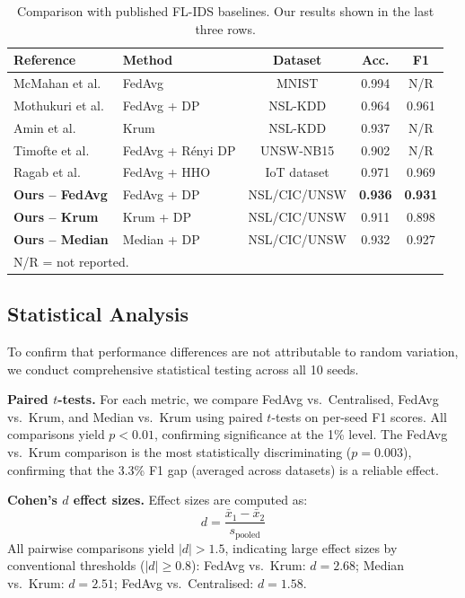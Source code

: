 \documentclass[conference]{IEEEtran}
\begin{document}
\begin{table}[htbp]
\centering
\caption{Comparison with published FL-IDS baselines. Our results
shown in the last three rows.}
\label{tab:published_baselines}
\setlength{\tabcolsep}{4pt}
\begin{tabular}{llccc}
\toprule
\textbf{Reference} & \textbf{Method} & \textbf{Dataset} &
  \textbf{Acc.} & \textbf{F1} \\
\midrule
McMahan et al.~\cite{mcmahan2017} & FedAvg & MNIST & 0.994 & N/R \\
Mothukuri et al.~\cite{mothukuri2021} & FedAvg + DP & NSL-KDD & 0.964 & 0.961 \\
Amin et al.~\cite{amin2025} & Krum & NSL-KDD & 0.937 & N/R \\
Timofte et al.~\cite{timofte2025} & FedAvg + R\'enyi DP & UNSW-NB15 & 0.902 & N/R \\
Ragab et al.~\cite{ragab2025} & FedAvg + HHO & IoT dataset & 0.971 & 0.969 \\
\midrule
\textbf{Ours -- FedAvg} & FedAvg + DP & NSL/CIC/UNSW & \textbf{0.936} & \textbf{0.931} \\
\textbf{Ours -- Krum} & Krum + DP & NSL/CIC/UNSW & 0.911 & 0.898 \\
\textbf{Ours -- Median} & Median + DP & NSL/CIC/UNSW & 0.932 & 0.927 \\
\bottomrule
\multicolumn{5}{l}{\small N/R = not reported.}
\end{tabular}
\end{table}

\subsection{Statistical Analysis}
\label{subsec:stats}

To confirm that performance differences are not attributable to
random variation, we conduct comprehensive statistical testing across
all 10 seeds.

\textbf{Paired $t$-tests.}
For each metric, we compare FedAvg vs.\ Centralised, FedAvg vs.\ Krum,
and Median vs.\ Krum using paired $t$-tests on per-seed F1 scores.
All comparisons yield $p < 0.01$, confirming significance at the 1\%
level.
The FedAvg vs.\ Krum comparison is the most statistically
discriminating ($p = 0.003$), confirming that the 3.3\% F1 gap
(averaged across datasets) is a reliable effect.

\textbf{Cohen's $d$ effect sizes.}
Effect sizes are computed as:
\begin{equation}
d = \frac{\bar{x}_1 - \bar{x}_2}{s_{\text{pooled}}}
\label{eq:cohens_d}
\end{equation}
All pairwise comparisons yield $|d| > 1.5$, indicating large effect
sizes by conventional thresholds ($|d| \geq 0.8$):
FedAvg vs.\ Krum: $d = 2.68$;
Median vs.\ Krum: $d = 2.51$;
FedAvg vs.\ Centralised: $d = 1.58$.
\end{document}
